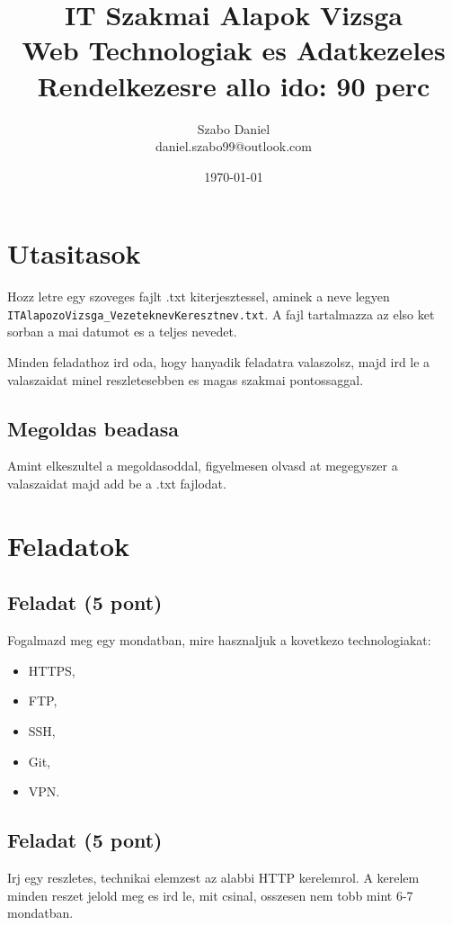 \documentclass{article}
\title{%
IT Szakmai Alapok Vizsga\\
\large Web Technologiak es Adatkezeles\\
\large Rendelkezesre allo ido: 90 perc}
\author{Szabo Daniel\\daniel.szabo99@outlook.com}
\date{\today}
\begin{document}
\maketitle

\section{Utasitasok}

Hozz letre egy szoveges fajlt .txt kiterjesztessel, aminek a neve legyen \\ \lstinline{ITAlapozoVizsga_VezeteknevKeresztnev.txt}. A fajl tartalmazza az elso ket sorban a mai datumot es a teljes nevedet.

Minden feladathoz ird oda, hogy hanyadik feladatra valaszolsz, majd ird le a valaszaidat minel reszletesebben es magas szakmai pontossaggal.

\subsection{Megoldas beadasa}

Amint elkeszultel a megoldasoddal, figyelmesen olvasd at megegyszer a valaszaidat majd add be a .txt fajlodat.

\newpage

\section{Feladatok}

\subsection{Feladat (5 pont)}

Fogalmazd meg egy mondatban, mire hasznaljuk a kovetkezo technologiakat:
\begin{itemize}
\item HTTPS,
\item FTP,
\item SSH,
\item Git,
\item VPN.
\end{itemize}

\subsection{Feladat  (5 pont)}

Irj egy reszletes, technikai elemzest az alabbi HTTP kerelemrol. A kerelem minden reszet jelold meg es ird le, mit csinal, osszesen nem tobb mint 6-7 mondatban.
\end{document}
